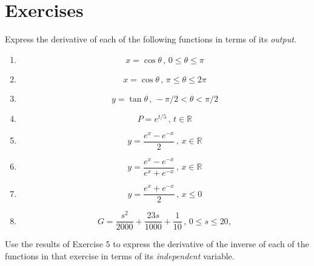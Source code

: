\documentclass{ximera}
\begin{document}
\section{Exercises}

\begin{exercise}  \label{Eggghhybvbxzzz}
Express the derivative of each of the following functions in terms of its \emph{output}.
\begin{enumerate}
\item 
\[
       x = \cos\theta \, , \, 0\leq \theta \leq \pi
\]


\item 
\[
       x = \cos\theta \, , \, \pi\leq \theta \leq 2\pi
\]

\item 
\[
       y = \tan\theta \, , \, -\pi/2 < \theta < \pi/2
\]

\item
\[
     P = e^{t/5} \, , \, t\in \mathbb{R} 
\]

\item 
\[
  y = \frac{e^x - e^{-x}}{2} \, , \, x\in \mathbb{R} 
\]

\item 
\[
  y = \frac{e^x - e^{-x}}{e^x + e^{-x}} \, , \, x\in \mathbb{R} 
\]

\item 
\[
  y = \frac{e^x+ e^{-x}}{2} \, , \, x \leq 0 
\]


\item
\[
   G = \frac{s^2}{2000} + \frac{23s}{1000} + \frac{1}{10} \, , \, 0\leq s\leq 20, 
\]

\end{enumerate}

\end{exercise}

\begin{exercise} \label{E898gbfgg}
Use the results of Exercise 5 to express the derivative of the inverse of each of the functions in that exercise in terms of its \emph{independent} variable.
\end{exercise}
\end{document}
